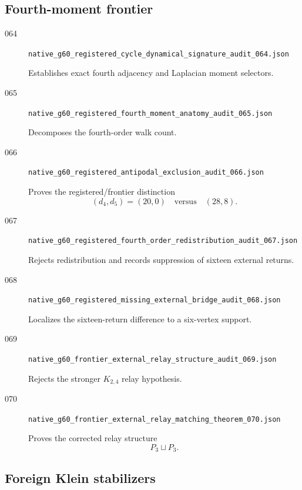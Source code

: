 \subsection{Fourth-moment frontier}

\begin{description}
    \item[064]
    \texttt{native\_g60\_registered\_cycle\_dynamical\_signature\_audit\_064.json}

    Establishes exact fourth adjacency and Laplacian moment selectors.

    \item[065]
    \texttt{native\_g60\_registered\_fourth\_moment\_anatomy\_audit\_065.json}

    Decomposes the fourth-order walk count.

    \item[066]
    \texttt{native\_g60\_registered\_antipodal\_exclusion\_audit\_066.json}

    Proves the registered/frontier distinction
    \[
    (d_4,d_5)=(20,0)
    \quad\text{versus}\quad
    (28,8).
    \]

    \item[067]
    \texttt{native\_g60\_registered\_fourth\_order\_redistribution\_audit\_067.json}

    Rejects redistribution and records suppression of sixteen external
    returns.

    \item[068]
    \texttt{native\_g60\_registered\_missing\_external\_bridge\_audit\_068.json}

    Localizes the sixteen-return difference to a six-vertex support.

    \item[069]
    \texttt{native\_g60\_frontier\_external\_relay\_structure\_audit\_069.json}

    Rejects the stronger \(K_{2,4}\) relay hypothesis.

    \item[070]
    \texttt{native\_g60\_frontier\_external\_relay\_matching\_theorem\_070.json}

    Proves the corrected relay structure
    \[
    P_3\sqcup P_3.
    \]
\end{description}

\subsection{Foreign Klein stabilizers}

